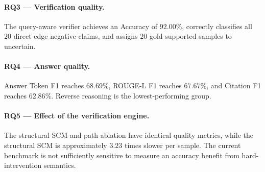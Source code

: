 \paragraph{RQ3 --- Verification quality.}

The query-aware verifier achieves an Accuracy of \(92.00\%\), correctly
classifies all \(20\) direct-edge negative claims, and assigns \(20\) gold
supported samples to uncertain.

\paragraph{RQ4 --- Answer quality.}

Answer Token F1 reaches \(68.69\%\), ROUGE-L F1 reaches \(67.67\%\), and
Citation F1 reaches \(62.86\%\). Reverse reasoning is the lowest-performing
group.

\paragraph{RQ5 --- Effect of the verification engine.}

The structural SCM and path ablation have identical quality metrics, while
the structural SCM is approximately \(3.23\) times slower per sample. The
current benchmark is not sufficiently sensitive to measure an accuracy
benefit from hard-intervention semantics.
